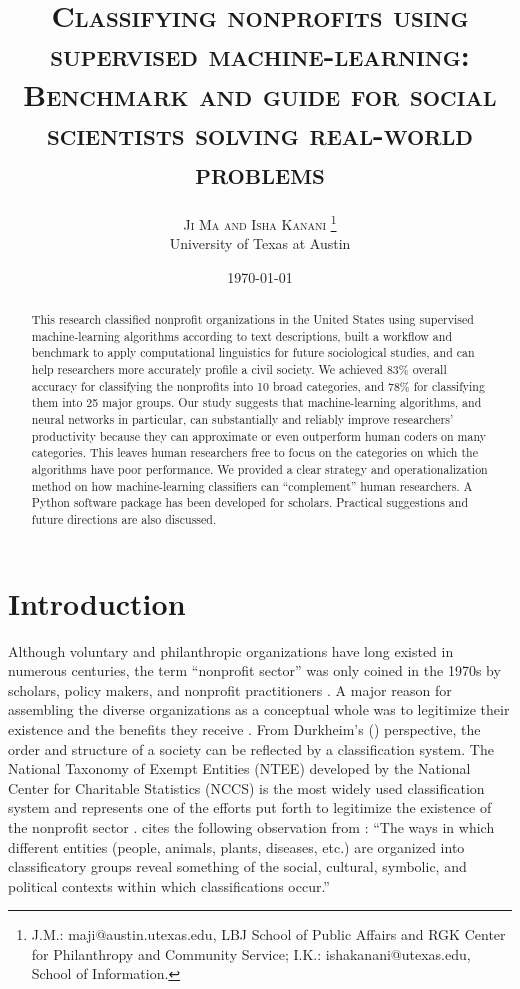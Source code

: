 \documentclass[11pt]{article}
\title{{\textsc{Classifying nonprofits using supervised machine-learning: Benchmark and guide for social scientists solving real-world problems}}}
\author{%
\textsc{Ji Ma and Isha Kanani} \thanks{J.M.: maji@austin.utexas.edu, LBJ School of Public Affairs and RGK Center for Philanthropy and Community Service; I.K.: ishakanani@utexas.edu, School of Information.} \\[1ex] %
\normalsize University of Texas at Austin \\ %
}
\date{\today} %
\begin{document}
\RaggedRight

\maketitle

\begin{abstract}

This research classified nonprofit organizations in the United States using supervised machine-learning algorithms according to text descriptions, built a workflow and benchmark to apply computational linguistics for future sociological studies, and can help researchers more accurately profile a civil society. We achieved 83\% overall accuracy for classifying the nonprofits into 10 broad categories, and 78\% for classifying them into 25 major groups. Our study suggests that machine-learning algorithms, and neural networks in particular, can substantially and reliably improve researchers' productivity because they can approximate or even outperform human coders on many categories. This leaves human researchers free to focus on the categories on which the algorithms have poor performance. We provided a clear strategy and operationalization method on how machine-learning classifiers can ``complement'' human researchers. A Python software package has been developed for scholars. Practical suggestions and future directions are also discussed. 

\end{abstract}
\clearpage

\tableofcontents
\listoftables
\listoffigures
\clearpage

\section{Introduction}

Although voluntary and philanthropic organizations have long existed in numerous centuries, the term ``nonprofit sector'' was only coined in the 1970s by scholars, policy makers, and nonprofit practitioners \parencite{HallHistoricalOverviewPhilanthropy2006}. A major reason for assembling the diverse organizations as a conceptual whole was to legitimize their existence and the benefits they receive \parencites[54-55]{HallHistoricalOverviewPhilanthropy2006}{BarmanClassificatoryStrugglesNonprofit2013}. From Durkheim's (\citeyear{DurkheimElementaryFormsReligious2012}) perspective, the order and structure of a society can be reflected by a classification system. The National Taxonomy of Exempt Entities (NTEE) developed by the National Center for Charitable Statistics (NCCS) is the most widely used classification system and represents one of the efforts put forth to legitimize the existence of the nonprofit sector \parencite{Hodgkinsonnewresearchplanning1991,HodgkinsonMappingnonprofitsector1990}. \textcite[105]{BarmanClassificatoryStrugglesNonprofit2013} cites the following observation from \textcite[601]{ClarkeSimpleTechnologyComplex1996}: ``The ways in which different entities (people, animals, plants, diseases, etc.) are organized into classificatory groups reveal something of the social, cultural, symbolic, and political contexts within which classifications occur.''
\end{document}
